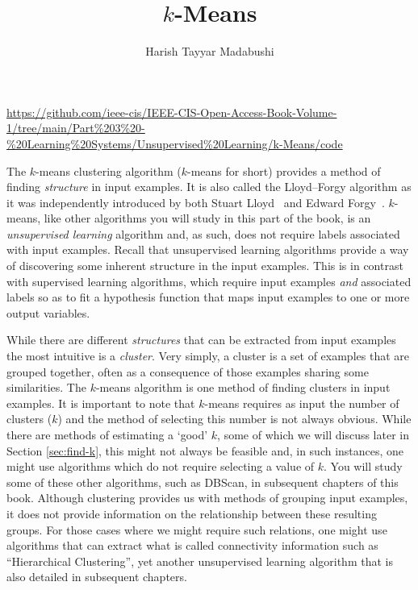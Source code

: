 \title{$k$-Means}
\label{chp:k-means}
\author{Harish Tayyar Madabushi}
\maketitle

\urldef\supplementurlkm\url{https://github.com/ieee-cis/IEEE-CIS-Open-Access-Book-Volume-1/tree/main/Part%203%20-%20Learning%20Systems/Unsupervised%20Learning/k-Means/code}


The $k$-means clustering algorithm ($k$-means for short) provides a method of finding \emph{structure} in input examples. It is also called the Lloyd--Forgy algorithm as it was independently introduced by both Stuart Lloyd~\cite{lloyd1982least} and Edward Forgy~\cite{Forgy1965ClusterAO}. $k$-means, like other algorithms you will study in this part of the book, is an \emph{unsupervised learning} algorithm and, as such, does not require labels associated with input examples. Recall that unsupervised learning algorithms provide a way of discovering some inherent structure in the input examples. This is in contrast with supervised learning algorithms, which require input examples \emph{and} associated labels so as to fit a hypothesis function that maps input examples to one or more output variables. 

While there are different \emph{structures} that can be extracted from input examples the most intuitive is a \emph{cluster}. Very simply, a cluster is a set of examples that are grouped together, often as a consequence of those examples sharing some similarities. The $k$-means algorithm is one method of finding clusters in input examples. It is important to note that $k$-means requires as input the number of clusters ($k$) and the method of selecting this number is not always obvious. While there are methods of estimating a `good' $k$, some of which we will discuss later in Section \ref{sec:find-k}, this might not always be feasible and, in such instances, one might use algorithms which do not require selecting a value of $k$. You will study some of these other algorithms, such as DBScan, in subsequent chapters of this book. Although clustering provides us with methods of grouping input examples, it does not provide information on the relationship between these resulting groups. For those cases where we might require such relations, one might use algorithms that can extract what is called connectivity information such as  ``Hierarchical Clustering'', yet another unsupervised learning algorithm that is also detailed in subsequent chapters.

